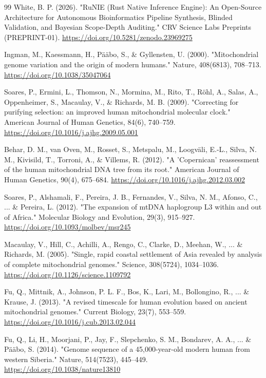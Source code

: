 \documentclass[10pt,letterpaper]{article}
\begin{document}
\begin{thebibliography}{99}
 White, B. P. (2026). "RuNIE (Rust Native Inference Engine): An Open-Source Architecture for Autonomous Bioinformatics Pipeline Synthesis, Blinded Validation, and Bayesian Scope-Depth Auditing." CRV Science Labs Preprints (PREPRINT-01). \url{https://doi.org/10.5281/zenodo.23969275}

 Ingman, M., Kaessmann, H., P\"a\"abo, S., \& Gyllensten, U. (2000). "Mitochondrial genome variation and the origin of modern humans." Nature, 408(6813), 708--713. \url{https://doi.org/10.1038/35047064}

 Soares, P., Ermini, L., Thomson, N., Mormina, M., Rito, T., R\"ohl, A., Salas, A., Oppenheimer, S., Macaulay, V., \& Richards, M. B. (2009). "Correcting for purifying selection: an improved human mitochondrial molecular clock." American Journal of Human Genetics, 84(6), 740--759. \url{https://doi.org/10.1016/j.ajhg.2009.05.001}

 Behar, D. M., van Oven, M., Rosset, S., Metspalu, M., Loogv\"ali, E.-L., Silva, N. M., Kivisild, T., Torroni, A., \& Villems, R. (2012). "A 'Copernican' reassessment of the human mitochondrial DNA tree from its root." American Journal of Human Genetics, 90(4), 675--684. \url{https://doi.org/10.1016/j.ajhg.2012.03.002}

 Soares, P., Alshamali, F., Pereira, J. B., Fernandes, V., Silva, N. M., Afonso, C., ... \& Pereira, L. (2012). "The expansion of mtDNA haplogroup L3 within and out of Africa." Molecular Biology and Evolution, 29(3), 915--927. \url{https://doi.org/10.1093/molbev/msr245}

 Macaulay, V., Hill, C., Achilli, A., Rengo, C., Clarke, D., Meehan, W., ... \& Richards, M. (2005). "Single, rapid coastal settlement of Asia revealed by analysis of complete mitochondrial genomes." Science, 308(5724), 1034--1036. \url{https://doi.org/10.1126/science.1109792}

 Fu, Q., Mittnik, A., Johnson, P. L. F., Bos, K., Lari, M., Bollongino, R., ... \& Krause, J. (2013). "A revised timescale for human evolution based on ancient mitochondrial genomes." Current Biology, 23(7), 553--559. \url{https://doi.org/10.1016/j.cub.2013.02.044}

 Fu, Q., Li, H., Moorjani, P., Jay, F., Slepchenko, S. M., Bondarev, A. A., ... \& P\"a\"abo, S. (2014). "Genome sequence of a 45,000-year-old modern human from western Siberia." Nature, 514(7523), 445--449. \url{https://doi.org/10.1038/nature13810}


\end{thebibliography}
\end{document}

